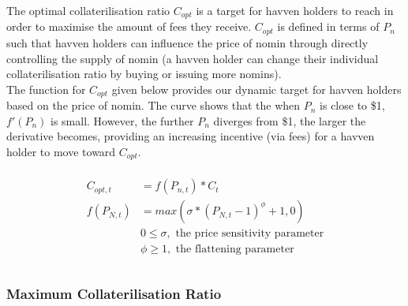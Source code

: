 \noindent The optimal collaterilisation ratio $C_{opt}$ is a target for havven holders to reach in order to maximise the amount of fees they receive. $C_{opt}$ is defined in terms of $P_n$ such that havven holders can influence the price of nomin through directly controlling the supply of nomin (a havven holder can change their individual collaterilisation ratio by buying or issuing more nomins). \\
 
\noindent The function for $C_{opt}$ given below provides our dynamic target for havven holders based on the price of nomin. The curve shows that the when $P_n$ is close to \$1, $ f'(P_n) $ is small. However, the further $P_n$ diverges from \$1, the larger the derivative becomes, providing an increasing incentive (via fees) for a havven holder to move toward $C_{opt}$.

\begin{gather} 
\begin{align}
\begin{split}
C_{opt,t} &= f(P_{n,t}) * C_t  \\ 
f(P_{N,t}) &= max(\sigma * (P_{N,t} - 1)^{\phi} + 1, 0) \\
& 0 \leq \sigma, \text{ the price sensitivity parameter} \\
& \phi \geq 1, \text{ the flattening parameter} \\
\end{split}
\end{align}
\end{gather}


\begin{center}
\end{center}

\newpage

\subsubsection{Maximum Collaterilisation Ratio}

